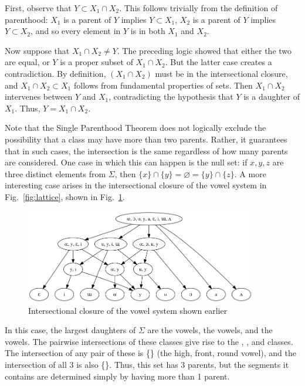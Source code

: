 \documentclass[11pt, oneside]{article}   	%
\begin{document}
First, observe that $Y \subset X_1 \cap X_2$. This follows trivially from the definition of parenthood: $X_1$ is a parent of $Y$ implies $Y \subset X_1$, $X_2$ is a parent of $Y$ implies $Y \subset X_2$, and so every element in $Y$ is in both $X_1$ and $X_2$.

Now suppose that $X_1 \cap X_2 \neq Y$. The preceding logic showed that either the two are equal, or $Y$ is a proper subset of  $X_1 \cap X_2$. But the latter case creates a contradiction. By definition, $(X_1 \cap X_2)$ must be in the intersectional closure, and $X_1 \cap X_2 \subset X_1$ follows from fundamental properties of sets. Then $X_1 \cap X_2$ intervenes between $Y$ and $X_1$, contradicting the hypothesis that $Y$ is a daughter of $X_1$. Thus, $Y = X_1 \cap X_2$.
	
\vspace{\baselineskip} Note that the Single Parenthood Theorem does not logically exclude the possibility that a class may have more than two parents. Rather, it guarantees that in such cases, the intersection is the same regardless of how many parents are considered. One case in which this can happen is the null set: if $x, y, z$ are three distinct elements from $\Sigma$, then $\{ x \} \cap \{ y \} = \varnothing = \{ y \} \cap \{ z \}$. A more interesting case arises in the intersectional closure of the vowel system in Fig.~\ref{fig:lattice}, shown in Fig.~\ref{fig:closure}. 

\begin{figure}[h]
\includegraphics[width=0.9\textwidth]{vowelHarmony_closure.png}
\caption{Intersectional closure of the vowel system shown earlier}
\label{fig:closure}
\end{figure}

In this case, the largest daughters of $\Sigma$ are the  vowels, the  vowels, and the  vowels. The pairwise intersections of these classes give rise to the , , and  classes. The intersection of any pair of these is \{\} (the high, front, round vowel), and the intersection of all 3 is also \{\}. Thus, this set has 3 parents, but the segments it contains are determined simply by having more than 1 parent.
\end{document}
